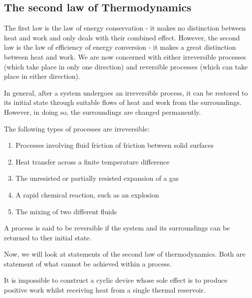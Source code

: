 \documentclass{article}
\begin{document}
\newpage

\subsection{The second law of Thermodynamics}

The first law is the law of energy conservation - it makes no distinction between heat and work and only deals with their combined effect. However, the second law is the law of efficiency of energy conversion - it makes a great distinction between heat and work. We are now concerned with either irreversible processes (which take place in only one direction) and reversible processes (which can take place in either direction).

\begin{definition}
    In general, after a system undergoes an irreversible process, it can be restored to its initial state through suitable flows of heat and work from the surroundings. However, in doing so, the surroundings are changed permanently.

    The following types of processes are irreversible:

\begin{enumerate}
    \item Processes involving fluid friction of friction between solid surfaces
    \item Heat transfer across a finite temperature difference
    \item The unresisted or partially resisted expansion of a gas
    \item A rapid chemical reaction, such as an explosion
    \item The mixing of two different fluids
\end{enumerate}
\end{definition}

\begin{definition}
    A process is said to be reversible if the system and its surroundings can be returned to ther initial state.
\end{definition}

Now, we will look at statements of the second law of thermodynamics. Both are statement of what cannot be achieved within a process.

\begin{theorem}
    It is impossible to construct a cyclic device whose sole effect is to produce positive work whilst receiving heat from a single thermal reservoir.
\end{theorem}
\end{document}
